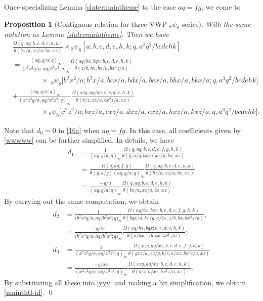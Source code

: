 \documentclass[xits,review,sort&compress]{elsarticle}
\newtheorem{xinzhi}[dl]{Proposition}
\numberwithin{equation}{section}
\def\pf{\noindent {\it Proof.} }
\begin{document}
Once specializing  Lemma \ref{slatermaintheme} to  the case $aq=fg$, we come to
\begin{xinzhi}[Contiguous relation for
three VWP ${}_{8}\psi _{8}$ series]\label{mainthtl} With the same notation as Lemma \ref{slatermaintheme}. Then we have
\begin{align}
&\frac{\Omega(q,aq;b,c,d,e,h,k)}{\theta(b x/a,x z/a,b x,x z)}\times{}_{8}\psi_{8}[a;b,c,d,e,h,k;q,a^3 q^2/bcdehk]\label{mainthtl-id}\\
&=\frac{(a q,q/a;q)_{\infty}}{\big(b^2x^2q/a,a q/b^2x^2;q\big)_{\infty}}
  \frac{\Omega(aq/bx,bqx;b,c,d,e,h,k)}{\theta(z/b, b x, bx/a, b x^2 z/a)}\nonumber\\
  &\qquad\qquad\times\,\,{}_{8}\psi_{8}\big[b^2 x^2/a;b^2 x/a,b c x/a,b d x/a,b e x/a,b h x/a,b k x/a;q,a^3 q^2/bcdehk\big]\nonumber\\
&+\frac{(a q,q/a;q)_{\infty}}{(x^2 z^2q/a,a q/x^2 z^2;q)_{\infty}}\frac{\Omega(xzq,aq/xz;b,c,d,e,h,k)}{
  \theta(b/z,x z/a,b x^2 z/a,x z)}\nonumber\\
  &\qquad\qquad\times{}_{8}\psi_{8}\big[x^2 z^2/a;bxz/a, c xz/a,d xz/a,e xz/a,hxz/a,kxz/a;q,a^3 q^2/bcdehk\big].\nonumber
\end{align}
\end{xinzhi}
\pf Note that $d_0=0$ in \eqref{16a} when $aq=fg$.
In this case,  all coefficients given by \eqref{wwwww} can be further simplified. In details, we have
\begin{align*}
  d_1 &= \frac{1}{(a q,q/a;q)_{\infty}}\frac{\Omega(q,aq;b,c,d,e,f,g,h,k)}
  {\theta(g,a/g,bx/a,x z/a,b x,x z)}\\
   &=\frac{\Omega(q,aq;f,g)}{\theta(g,a/g)(a q,q/a;q)_{\infty}}\frac{\Omega(q,aq;b,c,d,e,h,k)}
  {\theta(b x/a,x z/a,b x,x z)}\\
&=\frac{-g/a}{(a q,q/a;q)_{\infty}}\frac{\Omega(q,aq;b,c,d,e,h,k)}
  {\theta(b x/a,x z/a,b x,x z)}.
\end{align*}
By carrying out the same computation, we obtain
\begin{align*}
   d_2 &=\frac{1}{\big(b^2x^2q/a,a q/b^2x^2;q\big)_{\infty}}
  \frac{\Omega(aq/bx,bqx;b,c,d,e,f,g,h,k)}{\theta(b g x/a, b x/g, a/b x, z/b, b x, b x^2 z/a)},\\
  &=\frac{-g/bx}{\big(b^2x^2q/a,a q/b^2x^2;q\big)_{\infty}}
  \frac{\Omega(aq/bx,bqx;b,c,d,e,h,k)}{\theta(a/bx,z/b, b x, b x^2 z/a)};\\
   d_3 &=\frac{1}{(x^2 z^2q/a,a q/x^2z^2;q)_{\infty}}\frac{\Omega(xzq,aq/xz;b,c,d,e,f,g,h,k)}{
  \theta(g x z/a,x z/g,b/z,a/x z,b x^2 z/a,x z)}\\
  &=\frac{-g/xz}{(x^2 z^2q/a,a q/x^2 z^2;q)_{\infty}}\frac{\Omega(xzq,aq/xz;b,c,d,e,h,k)}{
  \theta(b/z,a/x z,b x^2 z/a,x z)}.
\end{align*}
By substituting all these into  \eqref{yyy} and  making   a bit simplification, we obtain  \eqref{mainthtl-id}.
\qed
\end{document}
